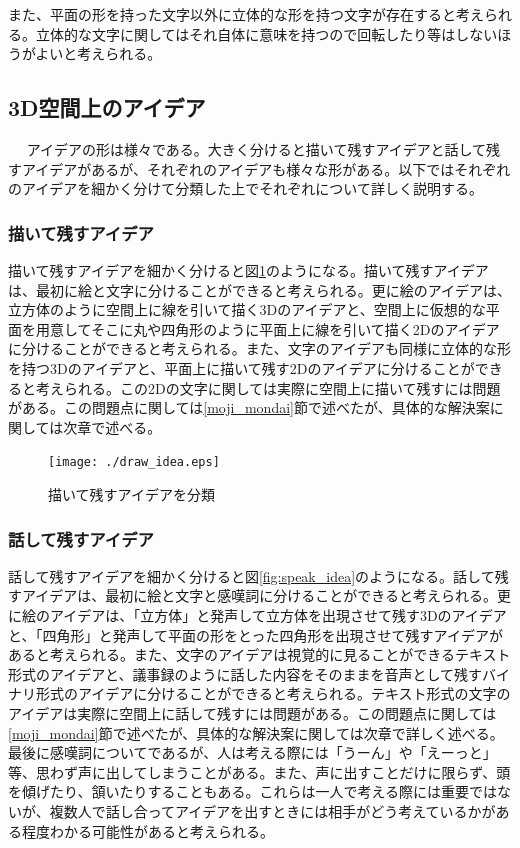 \documentclass[11pt,a4j, titlepage]{jarticle} %
\begin{document}
また、平面の形を持った文字以外に立体的な形を持つ文字が存在すると考えられる。立体的な文字に関してはそれ自体に意味を持つので回転したり等はしないほうがよいと考えられる。

\subsection{3D空間上のアイデア}　\label{idea_katachi}
アイデアの形は様々である。大きく分けると描いて残すアイデアと話して残すアイデアがあるが、それぞれのアイデアも様々な形がある。以下ではそれぞれのアイデアを細かく分けて分類した上でそれぞれについて詳しく説明する。

\subsubsection{描いて残すアイデア} \label{draw_idea}
描いて残すアイデアを細かく分けると図\ref{fig:draw_idea}のようになる。描いて残すアイデアは、最初に絵と文字に分けることができると考えられる。更に絵のアイデアは、立方体のように空間上に線を引いて描く3Dのアイデアと、空間上に仮想的な平面を用意してそこに丸や四角形のように平面上に線を引いて描く2Dのアイデアに分けることができると考えられる。また、文字のアイデアも同様に立体的な形を持つ3Dのアイデアと、平面上に描いて残す2Dのアイデアに分けることができると考えられる。この2Dの文字に関しては実際に空間上に描いて残すには問題がある。この問題点に関しては\ref{moji_mondai}節で述べたが、具体的な解決案に関しては次章で述べる。

\begin{figure}[H]
  \begin{center}
    \texttt{[image: ./draw\_idea.eps]}
    \caption{描いて残すアイデアを分類}
    \label{fig:draw_idea}
  \end{center}
\end{figure}

\subsubsection{話して残すアイデア} \label{speak_idea}
話して残すアイデアを細かく分けると図\ref{fig:speak_idea}のようになる。話して残すアイデアは、最初に絵と文字と感嘆詞に分けることができると考えられる。更に絵のアイデアは、「立方体」と発声して立方体を出現させて残す3Dのアイデアと、「四角形」と発声して平面の形をとった四角形を出現させて残すアイデアがあると考えられる。また、文字のアイデアは視覚的に見ることができるテキスト形式のアイデアと、議事録のように話した内容をそのままを音声として残すバイナリ形式のアイデアに分けることができると考えられる。テキスト形式の文字のアイデアは実際に空間上に話して残すには問題がある。この問題点に関しては\ref{moji_mondai}節で述べたが、具体的な解決案に関しては次章で詳しく述べる。最後に感嘆詞についてであるが、人は考える際には「うーん」や「えーっと」等、思わず声に出してしまうことがある。また、声に出すことだけに限らず、頭を傾げたり、頷いたりすることもある。これらは一人で考える際には重要ではないが、複数人で話し合ってアイデアを出すときには相手がどう考えているかがある程度わかる可能性があると考えられる。
\end{document}

